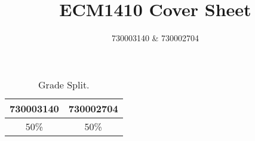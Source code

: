 \documentclass{article}
\title{ECM1410 Cover Sheet}
\author{730003140 \& 730002704}
\begin{document}
    \begin{titlepage}
        \maketitle

        \newskip

        \begin{table}[htbp]
            \centering
            \begin{tabular}{cc}
                \toprule
                \textbf{730003140} & \textbf{730002704} \\
                \midrule
                50\% & 50\% \\
                \bottomrule
            \end{tabular}
            \caption{Grade Split.}
        \end{table}


\end{titlepage}
\end{document}
